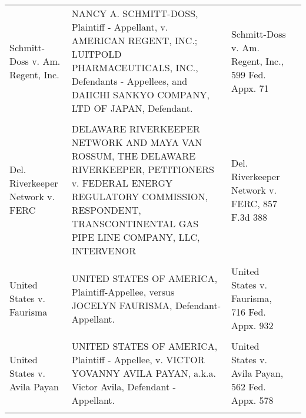 \documentclass[10pt, letterpaper]{article}
\begin{document}
\begin{spacing}{1.0}
\begin{table}[H]
\begin{tabular}{>{\raggedright}p{1.5in}>{\raggedright}p{3in}>{\raggedright}p{1.5in}p{0in}}
        Schmitt-Doss v. Am. Regent, Inc. & NANCY A. SCHMITT-DOSS, Plaintiff - Appellant, v. AMERICAN REGENT, INC.; LUITPOLD PHARMACEUTICALS, INC., Defendants - Appellees, and DAIICHI SANKYO COMPANY, LTD OF JAPAN, Defendant. & Schmitt-Doss v. Am. Regent, Inc., 599 Fed. Appx. 71 &\\
        & & &\\[-4pt]
        Del. Riverkeeper Network v. FERC & DELAWARE RIVERKEEPER NETWORK AND MAYA VAN ROSSUM, THE DELAWARE RIVERKEEPER, PETITIONERS v. FEDERAL ENERGY REGULATORY COMMISSION, RESPONDENT, TRANSCONTINENTAL GAS PIPE LINE COMPANY, LLC, INTERVENOR & Del. Riverkeeper Network v. FERC, 857 F.3d 388 &\\
        & & &\\[-4pt]
        United States v. Faurisma & UNITED STATES OF AMERICA, Plaintiff-Appellee, versus JOCELYN FAURISMA, Defendant-Appellant. & United States v. Faurisma, 716 Fed. Appx. 932 &\\
        & & &\\[-4pt]
        United States v. Avila Payan & UNITED STATES OF AMERICA, Plaintiff - Appellee, v. VICTOR YOVANNY AVILA PAYAN, a.k.a. Victor Avila, Defendant - Appellant. & United States v. Avila Payan, 562 Fed. Appx. 578 &\\[4pt]
        \hline\\[-6pt]
    \end{tabular}
    \label{tab:exampleCaseTitles}
\end{table}

\clearpage


\end{spacing}
\end{document}
